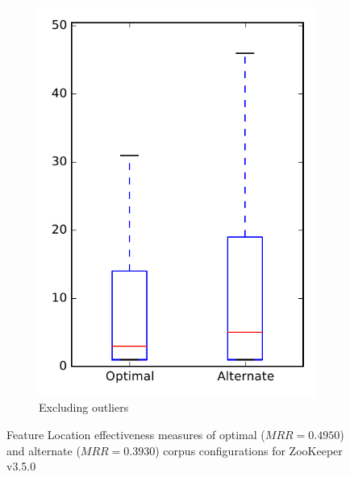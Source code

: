 \begin{figure}
\begin{subfigure}{.4\textwidth}
        \includegraphics[height=0.4\textheight]{figures/combo/flt_rq2_zookeeper_no_outlier}
        \caption{Excluding outliers}\label{fig:combo:flt:rq2:zookeeper_no_outlier}
    \end{subfigure}
\caption[Feature Location effectiveness measures of optimal and alternate corpus configurations for ZooKeeper v3.5.0]%
{Feature Location effectiveness measures of optimal ($MRR=0.4950$) and alternate ($MRR=0.3930$) corpus configurations for ZooKeeper v3.5.0}
\label{fig:combo:flt:rq2:zookeeper}
\end{figure}
